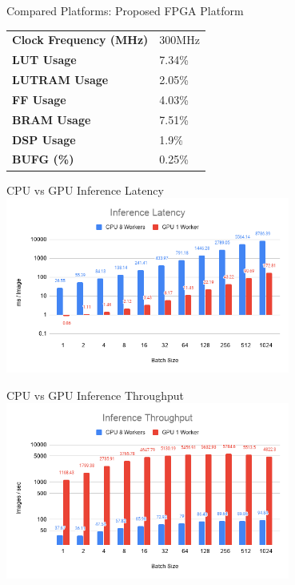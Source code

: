 \begin{frame}{Compared Platforms: Proposed FPGA Platform}
	\begin{table}[H]
		\centering
		\begin{tabular}{ll}
			\toprule
			\textbf{Clock Frequency (MHz)} & 300MHz \\
			\textbf{LUT Usage}             & 7.34\% \\
			\textbf{LUTRAM Usage}          & 2.05\% \\
			\textbf{FF Usage}              & 4.03\% \\
			\textbf{BRAM Usage}            & 7.51\% \\
			\textbf{DSP Usage}             & 1.9\%  \\
			\textbf{BUFG (\%)}             & 0.25\% \\
			\bottomrule
		\end{tabular}
	\end{table}
\end{frame}

\begin{frame}{CPU vs GPU Inference Latency}
	\centering
	\includegraphics[width=0.7\textwidth]{../Images/Results/CPU-GPU-Inference-Latency.png}\\
\end{frame}

\begin{frame}{CPU vs GPU Inference Throughput}
	\centering
	\includegraphics[width=0.7\textwidth]{../Images/Results/CPU-GPU-Inference-Throughput.png}\\
\end{frame}

